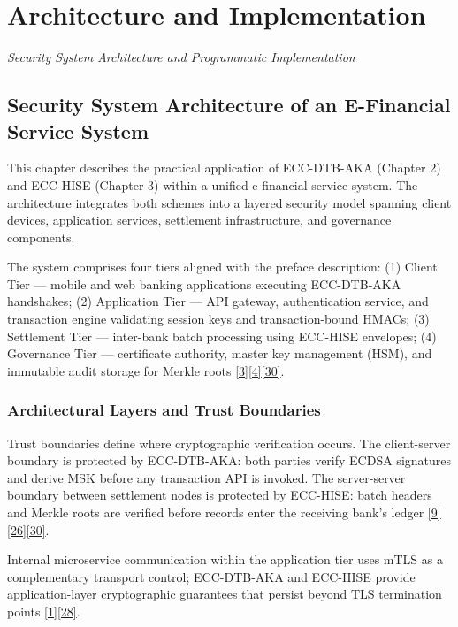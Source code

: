 \chapter{Architecture and Implementation}
\label{ch:chapter04}

\noindent\textit{Security System Architecture and Programmatic Implementation}\par\vspace{1em}

\section{Security System Architecture of an E-Financial Service System}

\indent This chapter describes the practical application of ECC-DTB-AKA (Chapter 2) and ECC-HISE (Chapter 3) within a unified e-financial service system. The architecture integrates both schemes into a layered security model spanning client devices, application services, settlement infrastructure, and governance components.

\indent The system comprises four tiers aligned with the preface description: (1) Client Tier --- mobile and web banking applications executing ECC-DTB-AKA handshakes; (2) Application Tier --- API gateway, authentication service, and transaction engine validating session keys and transaction-bound HMACs; (3) Settlement Tier --- inter-bank batch processing using ECC-HISE envelopes; (4) Governance Tier --- certificate authority, master key management (HSM), and immutable audit storage for Merkle roots \hyperref[ref:3]{[3]}\hyperref[ref:4]{[4]}\hyperref[ref:30]{[30]}.

\subsection{Architectural Layers and Trust Boundaries}

\indent Trust boundaries define where cryptographic verification occurs. The client-server boundary is protected by ECC-DTB-AKA: both parties verify ECDSA signatures and derive MSK before any transaction API is invoked. The server-server boundary between settlement nodes is protected by ECC-HISE: batch headers and Merkle roots are verified before records enter the receiving bank's ledger \hyperref[ref:9]{[9]}\hyperref[ref:26]{[26]}\hyperref[ref:30]{[30]}.

\indent Internal microservice communication within the application tier uses mTLS as a complementary transport control; ECC-DTB-AKA and ECC-HISE provide application-layer cryptographic guarantees that persist beyond TLS termination points \hyperref[ref:1]{[1]}\hyperref[ref:28]{[28]}.

